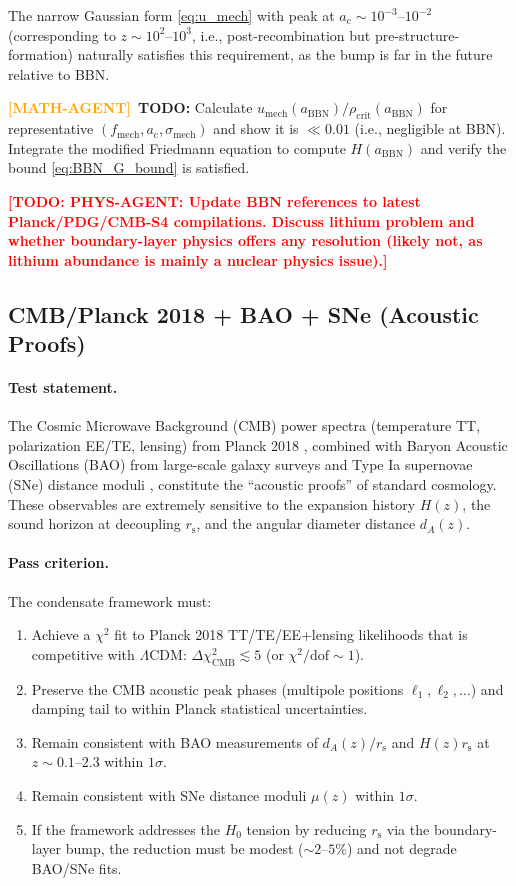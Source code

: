 \documentclass[11pt,a4paper]{article}
\newcommand{\ac}{a_{\mathrm{c}}}
\newcommand{\rs}{r_{\mathrm{s}}}
\newcommand{\sigmamech}{\sigma_{\mathrm{mech}}}
\newcommand{\fmech}{f_{\mathrm{mech}}}
\newcommand{\umech}{u_{\mathrm{mech}}}
\newcommand{\rhocrit}{\rho_{\mathrm{crit}}}
\theoremstyle{definition}
\newcommand{\TODO}[1]{\textcolor{red}{\textbf{[TODO: #1]}}}
\newcommand{\MATHAGENT}{\textcolor{orange}{\textbf{[MATH-AGENT]}}}
\begin{document}
The narrow Gaussian form \eqref{eq:u_mech} with peak at $\ac \sim 10^{-3}$--$10^{-2}$ (corresponding to $z \sim 10^2$--$10^3$, i.e., post-recombination but pre-structure-formation) naturally satisfies this requirement, as the bump is far in the future relative to BBN.

\MATHAGENT~\textbf{TODO:} Calculate $\umech(a_{\mathrm{BBN}})/\rhocrit(a_{\mathrm{BBN}})$ for representative $(\fmech, \ac, \sigmamech)$ and show it is $\ll 0.01$ (i.e., negligible at BBN). Integrate the modified Friedmann equation to compute $H(a_{\mathrm{BBN}})$ and verify the bound \eqref{eq:BBN_G_bound} is satisfied.

\TODO{PHYS-AGENT: Update BBN references to latest Planck/PDG/CMB-S4 compilations. Discuss lithium problem and whether boundary-layer physics offers any resolution (likely not, as lithium abundance is mainly a nuclear physics issue).}

\subsection{CMB/Planck 2018 + BAO + SNe (Acoustic Proofs)}
\label{sec:CMB_Planck}

\paragraph{Test statement.}
The Cosmic Microwave Background (CMB) power spectra (temperature TT, polarization EE/TE, lensing) from Planck 2018 \cite{Planck2018}, combined with Baryon Acoustic Oscillations (BAO) from large-scale galaxy surveys \cite{BOSS_BAO,eBOSS_BAO} and Type Ia supernovae (SNe) distance moduli \cite{Pantheon,PantheonPlus}, constitute the ``acoustic proofs'' of standard cosmology. These observables are extremely sensitive to the expansion history $H(z)$, the sound horizon at decoupling $\rs$, and the angular diameter distance $d_A(z)$.

\paragraph{Pass criterion.}
The condensate framework must:
\begin{enumerate}[leftmargin=2.2em]
  \item Achieve a $\chi^2$ fit to Planck 2018 TT/TE/EE+lensing likelihoods that is competitive with $\Lambda$CDM: $\Delta\chi^2_{\mathrm{CMB}} \lesssim 5$ (or $\chi^2/\mathrm{dof} \sim 1$).
  \item Preserve the CMB acoustic peak phases (multipole positions $\ell_1, \ell_2, \dots$) and damping tail to within Planck statistical uncertainties.
  \item Remain consistent with BAO measurements of $d_A(z)/\rs$ and $H(z) \rs$ at $z \sim 0.1$--$2.3$ within $1\sigma$.
  \item Remain consistent with SNe distance moduli $\mu(z)$ within $1\sigma$.
  \item If the framework addresses the $H_0$ tension by reducing $\rs$ via the boundary-layer bump, the reduction must be modest ($\sim 2$--$5\%$) and not degrade BAO/SNe fits.
\end{enumerate}
\end{document}
